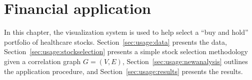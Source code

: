
\chapter{Financial application \label{ch:usage}}

In this chapter, the visualization system is used to help select a ``buy and 
hold'' portfolio of healthcare stocks. 
Section~\ref{sec:usage:data} presents the data, 
Section~\ref{sec:usage:stockselection} presents a simple stock selection 
methodology given a correlation graph $G=(V,E)$, 
Section~\ref{sec:usage:newanalysis} outlines the application 
procedure, and Section~\ref{sec:usage:results} presents the results.



%



